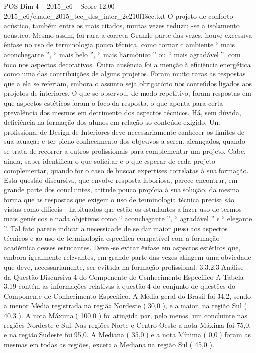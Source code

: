\begin{textsample}{POS Dim 4 – 2015\_c6 – Score 12.00 – 2015\_c6/enade\_2015\_tec\_des\_inter\_2e210f18ec.txt}
O projeto de conforto acústico, também entre os mais citados, muitas vezes reduziu -se a isolamento acústico.
Mesmo assim, foi rara a correta Grande parte das vezes, houve excessiva ênfase no uso de terminologia pouco técnica, como tornar o ambiente “ mais aconchegante ”, “ mais belo ”, “ mais harmônico ” ou “ mais agradável ”, com foco nos aspectos decorativos.
Outra ausência foi a menção à eficiência energética como uma das contribuições de alguns projetos.
Foram muito raras as respostas que a ela se referiam, embora o assunto seja obrigatório nos conteúdos ligados aos projetos de interiores.
O que se observou, de modo repetitivo, foram respostas em que aspectos estéticos foram o foco da resposta, o que aponta para certa prevalência dos mesmos em detrimento dos aspectos técnicos.
Há, sem dúvida, deficiência na formação dos alunos em relação ao conteúdo exigido.
Um profissional de Design de Interiores deve necessariamente conhecer os limites de sua atuação e ter pleno conhecimento dos objetivos a serem alcançados, quando se trata de recorrer a outros profissionais para complementar um projeto.
Cabe, ainda, saber identificar o que solicitar e o que esperar de cada projeto complementar, quando for o caso de buscar expertises correlatas à sua formação.
Esta questão discursiva, que envolve resposta laboriosa, parece encontrar, em grande parte dos concluintes, atitude pouco propícia à sua solução, da mesma forma que as respostas que exigem o uso de terminologia técnica precisa são vistas como difíceis - habituados que estão os estudantes a fazer uso de termos mais genéricos e nada objetivos como “ aconchegante ”, “ agradável ” e “ elegante ”.
Tal fato parece indicar a necessidade de se dar maior \textbf{peso} aos aspectos técnicos e ao uso de terminologia específica compatível com a formação acadêmica desses estudantes.
Deve -se evitar ênfase em aspectos estéticos que, embora igualmente relevantes, em grande parte das vezes atingem uma obviedade que deve, necessariamente, ser evitada na formação profissional. 3.3.2.3 Análise da Questão Discursiva 4 do Componente de Conhecimento Específico A Tabela 3.19 contém as informações relativas à questão 4 do conjunto de questões do Componente de Conhecimento Específico.
A Média geral do Brasil foi 34,2, sendo a menor Média registrada na região Nordeste ( 30,0 ), e a maior, na região Sul ( 40,3 ).
A nota Máxima ( 100,0 ) foi atingida por, pelo menos, um concluinte nas regiões Nordeste e Sul.
Nas regiões Norte e Centro-Oeste a nota Máxima foi 75,0, e na região Sudeste foi 95,0.
A Mediana ( 35,0 ) e a nota Mínima ( 0,0 ) foram as mesmas em todas as regiões, exceto a Mediana na região Sul ( 45,0 ).

\end{textsample}
